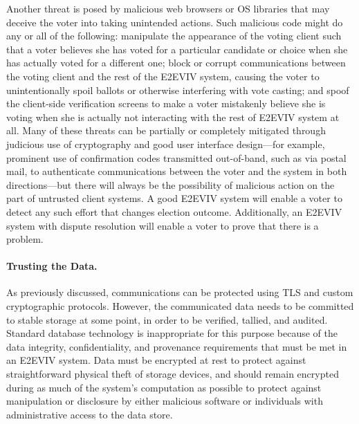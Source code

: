 Another threat is posed by malicious web browsers or OS libraries that
may deceive the voter into taking unintended actions. Such malicious
code might do any or all of the following: manipulate the appearance
of the voting client such that a voter believes she has voted for a
particular candidate or choice when she has actually voted for a
different one; block or corrupt communications between the voting
client and the rest of the E2EVIV system, causing the voter to
unintentionally spoil ballots or otherwise interfering with vote
casting; and spoof the client-side verification screens to make a
voter mistakenly believe she is voting when she is actually not
interacting with the rest of E2EVIV system at all. Many of these
threats can be partially or completely mitigated through judicious use
of cryptography and good user interface design---for example, prominent
use of confirmation codes transmitted out-of-band, such as via postal
mail, to authenticate communications between the voter and the system
in both directions---but there will always be the possibility of
malicious action on the part of untrusted client systems. A good E2EVIV system will enable a voter to detect any such effort that changes election outcome. Additionally, an E2EVIV system with dispute resolution will enable a voter to prove that there is a problem. 

\paragraph{Trusting the Data.} As previously discussed, communications
can be protected using TLS and custom cryptographic protocols.
However, the communicated data needs to be committed to stable storage
at some point, in order to be verified, tallied, and audited. Standard
database technology is inappropriate for this purpose because of the
data integrity, confidentiality, and provenance requirements that must
be met in an E2EVIV system. Data must be encrypted at rest to protect
against straightforward physical theft of storage devices, and should
remain encrypted during as much of the system's computation as
possible to protect against manipulation or disclosure by either
malicious software or individuals with administrative access to the
data store.

